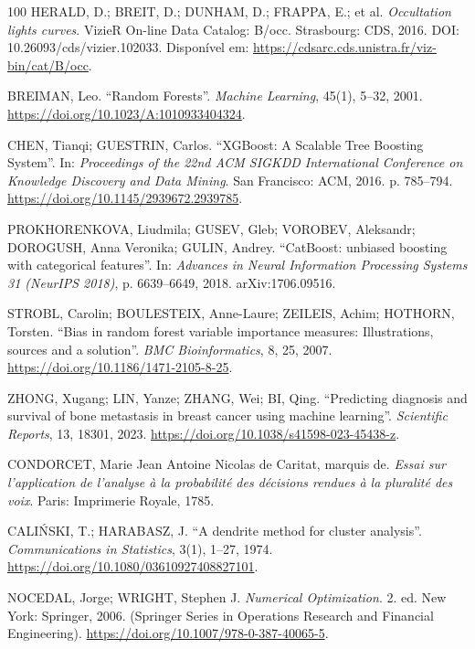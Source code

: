 \documentclass[msc]{on} %
\begin{document}
\begin{thebibliography}{100}
 HERALD, D.; BREIT, D.; DUNHAM, D.; FRAPPA, E.; et al. \textit{Occultation lights curves}. VizieR On-line Data Catalog: B/occ. Strasbourg: CDS, 2016. DOI: 10.26093/cds/vizier.102033. Disponível em: \url{https://cdsarc.cds.unistra.fr/viz-bin/cat/B/occ}.

 BREIMAN, Leo. ``Random Forests''. \emph{Machine Learning}, 45(1), 5--32, 2001. \url{https://doi.org/10.1023/A:1010933404324}.

 CHEN, Tianqi; GUESTRIN, Carlos. ``XGBoost: A Scalable Tree Boosting System''. In: \emph{Proceedings of the 22nd ACM SIGKDD International Conference on Knowledge Discovery and Data Mining}. San Francisco: ACM, 2016. p. 785--794. \url{https://doi.org/10.1145/2939672.2939785}.

 PROKHORENKOVA, Liudmila; GUSEV, Gleb; VOROBEV, Aleksandr; DOROGUSH, Anna Veronika; GULIN, Andrey. ``CatBoost: unbiased boosting with categorical features''. In: \emph{Advances in Neural Information Processing Systems 31 (NeurIPS 2018)}, p. 6639--6649, 2018. arXiv:1706.09516.

 STROBL, Carolin; BOULESTEIX, Anne-Laure; ZEILEIS, Achim; HOTHORN, Torsten. ``Bias in random forest variable importance measures: Illustrations, sources and a solution''. \emph{BMC Bioinformatics}, 8, 25, 2007. \url{https://doi.org/10.1186/1471-2105-8-25}.

 ZHONG, Xugang; LIN, Yanze; ZHANG, Wei; BI, Qing. ``Predicting diagnosis and survival of bone metastasis in breast cancer using machine learning''. \emph{Scientific Reports}, 13, 18301, 2023. \url{https://doi.org/10.1038/s41598-023-45438-z}.

 CONDORCET, Marie Jean Antoine Nicolas de Caritat, marquis de. \textit{Essai sur l'application de l'analyse à la probabilité des décisions rendues à la pluralité des voix}. Paris: Imprimerie Royale, 1785.

 CALI\'{N}SKI, T.; HARABASZ, J. ``A dendrite method for cluster analysis''. \emph{Communications in Statistics}, 3(1), 1--27, 1974. \url{https://doi.org/10.1080/03610927408827101}.

 NOCEDAL, Jorge; WRIGHT, Stephen J. \textit{Numerical Optimization}. 2. ed. New York: Springer, 2006. (Springer Series in Operations Research and Financial Engineering). \url{https://doi.org/10.1007/978-0-387-40065-5}.


\end{thebibliography}
\end{document}
